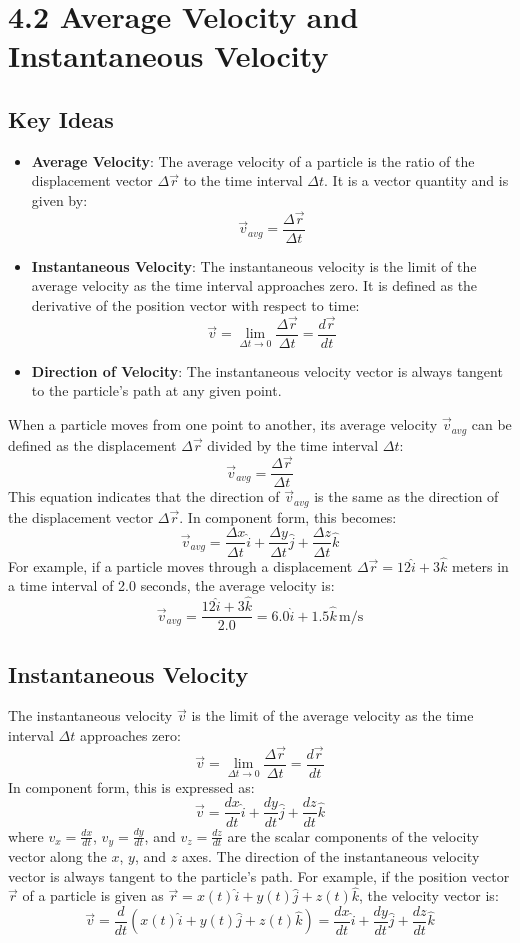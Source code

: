 \documentclass{article}
\begin{document}
\section*{4.2 Average Velocity and Instantaneous Velocity}
\subsection*{Key Ideas}
\begin{itemize}
    \item \textbf{Average Velocity}: The average velocity of a particle is the ratio of the displacement vector $\Delta \vec{r}$ to the time interval $\Delta t$. It is a vector quantity and is given by:
    \[
    \vec{v}_{avg} = \frac{\Delta \vec{r}}{\Delta t}
    \]
    \item \textbf{Instantaneous Velocity}: The instantaneous velocity is the limit of the average velocity as the time interval approaches zero. It is defined as the derivative of the position vector with respect to time:
    \[
    \vec{v} = \lim_{\Delta t \to 0} \frac{\Delta \vec{r}}{\Delta t} = \frac{d\vec{r}}{dt}
    \]
    \item \textbf{Direction of Velocity}: The instantaneous velocity vector is always tangent to the particle's path at any given point.
\end{itemize}
When a particle moves from one point to another, its average velocity $\vec{v}_{avg}$ can be defined as the displacement $\Delta \vec{r}$ divided by the time interval $\Delta t$:
\[
\vec{v}_{avg} = \frac{\Delta \vec{r}}{\Delta t}
\]
This equation indicates that the direction of $\vec{v}_{avg}$ is the same as the direction of the displacement vector $\Delta \vec{r}$. In component form, this becomes:
\[
\vec{v}_{avg} = \frac{\Delta x}{\Delta t} \hat{i} + \frac{\Delta y}{\Delta t} \hat{j} + \frac{\Delta z}{\Delta t} \hat{k}
\]
For example, if a particle moves through a displacement $\Delta \vec{r} = 12\hat{i} + 3\hat{k}$ meters in a time interval of 2.0 seconds, the average velocity is:
\[
\vec{v}_{avg} = \frac{12\hat{i} + 3\hat{k}}{2.0} = 6.0\hat{i} + 1.5\hat{k} \, \text{m/s}
\]

\subsection*{Instantaneous Velocity}
The instantaneous velocity $\vec{v}$ is the limit of the average velocity as the time interval $\Delta t$ approaches zero:
\[
\vec{v} = \lim_{\Delta t \to 0} \frac{\Delta \vec{r}}{\Delta t} = \frac{d\vec{r}}{dt}
\]
In component form, this is expressed as:
\[
\vec{v} = \frac{dx}{dt} \hat{i} + \frac{dy}{dt} \hat{j} + \frac{dz}{dt} \hat{k}
\]
where $v_x = \frac{dx}{dt}$, $v_y = \frac{dy}{dt}$, and $v_z = \frac{dz}{dt}$ are the scalar components of the velocity vector along the $x$, $y$, and $z$ axes.
The direction of the instantaneous velocity vector is always tangent to the particle’s path. For example, if the position vector $\vec{r}$ of a particle is given as $\vec{r} = x(t)\hat{i} + y(t)\hat{j} + z(t)\hat{k}$, the velocity vector is:
\[
\vec{v} = \frac{d}{dt} (x(t)\hat{i} + y(t)\hat{j} + z(t)\hat{k}) = \frac{dx}{dt} \hat{i} + \frac{dy}{dt} \hat{j} + \frac{dz}{dt} \hat{k}
\]
\end{document}
